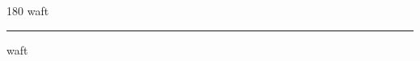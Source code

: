 
\begin{frame}
\begin{center}
\begin{turn}{180}
{\fontsize{2.5cm}{1em}\selectfont waft}
\end{turn}
\vspace{1em}\par  
\hrule
\vspace{1em}\par  
{\fontsize{2.5cm}{1em}\selectfont waft}
\end{center}
\end{frame}
